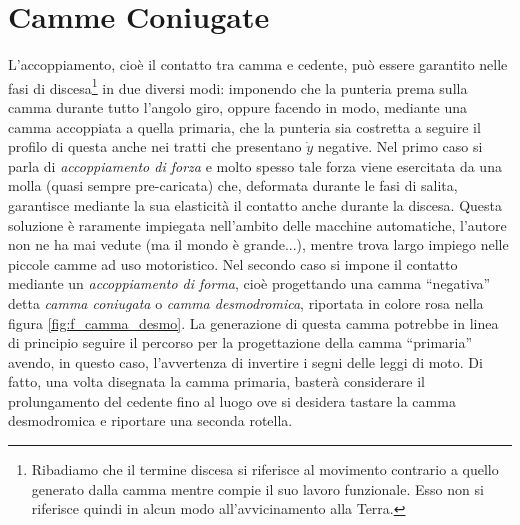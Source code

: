 \section{Camme Coniugate}

\noindent L'accoppiamento, cio\`e il contatto tra camma e cedente, pu\`o essere
 garantito nelle fasi di discesa\footnote{
Ribadiamo che il termine discesa si riferisce al movimento contrario
a quello generato dalla camma mentre compie il suo lavoro funzionale.
Esso non si riferisce
quindi in alcun modo all'avvicinamento alla Terra.
} in due diversi modi:
imponendo che la punteria prema sulla camma durante tutto l'angolo giro, oppure
facendo in modo, mediante una camma accoppiata a quella primaria, che la punteria
sia costretta a seguire il profilo di questa anche nei tratti che presentano $\dot y$ 
negative.
Nel primo caso si parla di {\em accoppiamento di forza}
e molto spesso tale forza viene esercitata da una molla (quasi sempre
pre-caricata) che, deformata
durante le fasi di salita, garantisce mediante la sua elasticit\`a il contatto
anche durante la discesa. Questa soluzione \`e raramente impiegata nell'ambito
delle macchine automatiche, l'autore non ne ha mai vedute (ma il mondo
\`e grande...), mentre trova largo impiego nelle piccole camme ad uso motoristico.
Nel secondo caso si impone il contatto mediante un {\em accoppiamento di forma}, cio\`e progettando una camma ``negativa'' detta
{\em camma coniugata} o {\em camma desmodromica}, riportata in colore rosa
nella figura \ref{fig:f_camma_desmo}.
La generazione di questa camma potrebbe in linea di principio seguire il percorso
per la progettazione della camma ``primaria'' avendo, in questo caso, l'avvertenza di invertire i
segni delle leggi di moto. Di fatto, una volta disegnata la camma primaria,
baster\`a
considerare il prolungamento del cedente fino al luogo ove si desidera tastare 
la camma desmodromica e riportare una seconda rotella.

